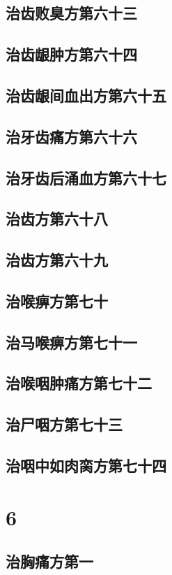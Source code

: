 \documentclass[a4paper,12pt,UTF8,twoside]{ctexbook}
\begin{document}
\chapter{治齿败臭方第六十三}
\chapter{治齿龈肿方第六十四}
\chapter{治齿龈间血出方第六十五}
\chapter{治牙齿痛方第六十六}
\chapter{治牙齿后涌血方第六十七}
\chapter{治齿方第六十八}
\chapter{治齿方第六十九}
\chapter{治喉痹方第七十}
\chapter{治马喉痹方第七十一}
\chapter{治喉咽肿痛方第七十二}
\chapter{治尸咽方第七十三}
\chapter{治咽中如肉脔方第七十四}

\part{6}
\chapter{治胸痛方第一}
\end{document}
